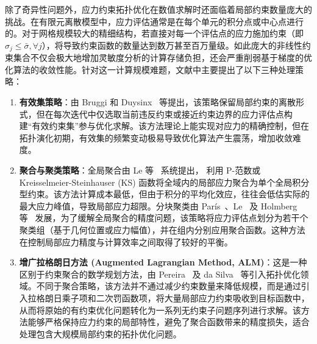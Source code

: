 除了奇异性问题外，应力约束拓扑优化在数值求解时还面临着局部约束数量庞大的挑战。在有限元离散模型中，应力评估通常是在每个单元的积分点或中心点进行的。对于网格规模较大的精细结构，若直接对每一个评估点的应力施加约束（即 $\sigma_{j} \le \bar{\sigma}, \forall j$），将导致约束函数的数量达到数万甚至百万量级。如此庞大的非线性约束集合不仅会极大地增加灵敏度分析的计算存储负担，还会严重削弱基于梯度的优化算法的收敛性能。针对这一计算规模难题，文献中主要提出了以下三种处理策略：
\begin{enumerate}[
	label={（\arabic*）},
	labelsep=0.25em,
	leftmargin=3.2em,
	itemsep=0.4em,
	topsep=0.4em,
	parsep=0pt,
	partopsep=0pt
	]
	\item \textbf{有效集策略}：由 Bruggi 和 Duysinx~\cite{bruggiTopologyOptimizationMinimum2012} 等提出，该策略保留局部约束的离散形式，但在每次迭代中仅选取当前违反约束或接近约束边界的应力评估点构建“有效约束集”参与优化求解。该方法理论上能实现对应力的精确控制，但在拓扑演化初期，有效集的频繁变动极易导致优化算法产生震荡，增加收敛难度。
	
	\item \textbf{聚合与聚类策略}：全局聚合由 Le 等~\cite{leStressbasedTopologyOptimization2010b} 系统提出，
	利用 P-范数或 Kreisselmeier-Steinhauser (KS) 函数将全域内的局部应力聚合为单个全局积分型约束。该方法计算成本最低，但由于积分的平均化效应，往往会低估实际的最大应力峰值，导致局部应力超限。分块聚类由 París~\cite{parisBlockAggregationStress2010}、Le~\cite{leStressbasedTopologyOptimization2010b} 及 Holmberg 等~\cite{holmbergStressConstrainedTopology2013a} 发展，为了缓解全局聚合的精度问题，该策略将应力评估点划分为若干个聚类组（基于几何位置或应力幅值），并在组内分别应用聚合函数。这种方法在控制局部应力精度与计算效率之间取得了较好的平衡。
	
	\item \textbf{增广拉格朗日方法 (Augmented Lagrangian Method, ALM)}：这是一种区别于约束聚合的数学规划方法，由 Pereira~\cite{pereiraTopologyOptimizationContinuum2004} 及 da Silva~\cite{dasilvaTopologyOptimizationContinuum2018} 等引入拓扑优化领域。不同于聚合策略，该方法并不通过减少约束数量来降低规模，而是通过引入拉格朗日乘子项和二次罚函数项，将大量局部应力约束吸收到目标函数中，从而将原始的有约束优化问题转化为一系列无约束子问题序列进行求解。该方法能够严格保持应力约束的局部特性，避免了聚合函数带来的精度损失，适合处理包含大规模局部约束的拓扑优化问题。
\end{enumerate}

